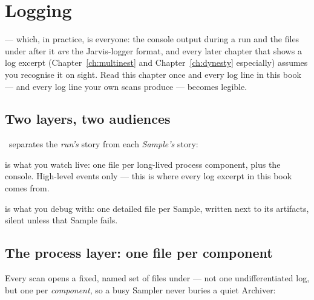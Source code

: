 \chapter{Logging}
\label{ch:logging}

 ---
which, in practice, is everyone: the console output during a run and the files under
 after it \emph{are} the Jarvis-logger format, and every later chapter
that shows a log excerpt (Chapter~\ref{ch:multinest} and Chapter~\ref{ch:dynesty}
especially) assumes you recognise it on sight. Read this chapter once and every log
line in this book --- and every log line your own scans produce --- becomes legible.

\section{Two layers, two audiences}
\label{sec:two-layer-logging}

\Jtwo\ separates the \emph{run's} story from each \emph{Sample's} story:

\begin{description}[style=nextline, leftmargin=1.2em]
  \item[The process layer] is what you watch live: one file per long-lived process
        component, plus the console. High-level events only --- this is where every
        log excerpt in this book comes from.
  \item[The Sample layer] is what you debug with: one detailed file per Sample,
        written next to its artifacts, silent unless that Sample fails.
\end{description}

\section{The process layer: one file per component}
\label{sec:top-logs}

Every scan opens a fixed, named set of files under  --- not one
undifferentiated log, but one per \emph{component}, so a busy Sampler never buries a
quiet Archiver:

\begin{jfiletree}
\end{jfiletree}

